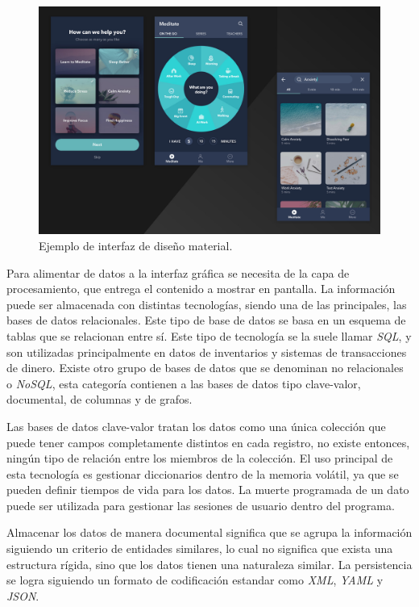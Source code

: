 \begin{figure}[h]
	\centering
	\includegraphics[width=\textwidth]{./Figures/ch1MaterialDesign.jpg}
	\caption{Ejemplo de interfaz de diseño material.}
	\label{fig:ch1MaterialDesign}
\end{figure}

Para alimentar de datos a la interfaz gráfica se necesita de la capa de procesamiento, que entrega el contenido a mostrar en pantalla. La información puede ser almacenada con distintas tecnologías, siendo una de las principales, las bases de datos relacionales.
Este tipo de base de datos se basa en un esquema de tablas que se relacionan entre sí. Este tipo de tecnología se la suele llamar \emph{SQL}, y son utilizadas principalmente en datos de inventarios y sistemas de transacciones de dinero.
Existe otro grupo de bases de datos que se denominan no relacionales o \emph{NoSQL}, esta categoría contienen a las bases de datos tipo clave-valor, documental, de columnas y de grafos.

Las bases de datos clave-valor tratan los datos como una única colección que puede tener campos completamente distintos en cada registro, no existe entonces, ningún tipo de relación entre los miembros de la colección. El uso principal de esta tecnología es gestionar diccionarios dentro de la memoria volátil, ya que se pueden definir tiempos de vida para los datos. La muerte programada de un dato puede ser utilizada para gestionar las sesiones de usuario dentro del programa.

Almacenar los datos de manera documental significa que se agrupa la información siguiendo un criterio de entidades similares, lo cual no significa que exista una estructura rígida, sino que los datos tienen una naturaleza similar.
La persistencia se logra siguiendo un formato de codificación estandar como \emph{XML}, \emph{YAML} y \emph{JSON}.

